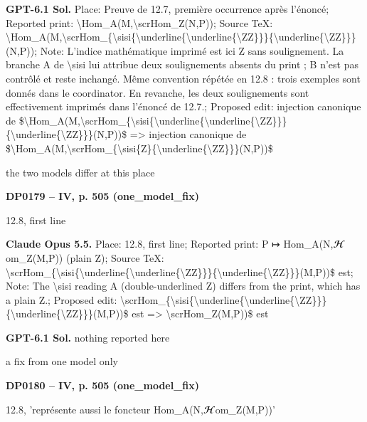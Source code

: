 \textbf{GPT-6.1 Sol.} Place: Preuve de 12.7, première occurrence après l'énoncé; Reported print: \textbackslash{}Hom\_A(M,\textbackslash{}scrHom\_Z(N,P)); Source TeX: \textbackslash{}Hom\_A(M,\textbackslash{}scrHom\_\{\textbackslash{}sisi\{\textbackslash{}underline\{\textbackslash{}underline\{\textbackslash{}ZZ\}\}\}\{\textbackslash{}underline\{\textbackslash{}ZZ\}\}\}(N,P)); Note: L'indice mathématique imprimé est ici Z sans soulignement. La branche A de \textbackslash{}sisi lui attribue deux soulignements absents du print ; B n'est pas contrôlé et reste inchangé. Même convention répétée en 12.8 : trois exemples sont donnés dans le coordinator. En revanche, les deux soulignements sont effectivement imprimés dans l'énoncé de 12.7.; Proposed edit: injection canonique de \$\textbackslash{}Hom\_A(M,\textbackslash{}scrHom\_\{\textbackslash{}sisi\{\textbackslash{}underline\{\textbackslash{}underline\{\textbackslash{}ZZ\}\}\}\{\textbackslash{}underline\{\textbackslash{}ZZ\}\}\}(N,P))\$ =\allowbreak > injection canonique de \$\textbackslash{}Hom\_A(M,\textbackslash{}scrHom\_\{\textbackslash{}sisi\{Z\}\{\textbackslash{}underline\{\textbackslash{}ZZ\}\}\}(N,P))\$\par
the two models differ at this place\par
\par\noindent\hypertarget{DP0179}{}\textbf{DP0179 -- IV, p. 505 (one\_model\_fix)}\par
12.8, first line\par
\textbf{Claude Opus 5.5.} Place: 12.8, first line; Reported print: P ↦ Hom\_A(N,\ensuremath{𝓗}om\_Z(M,P)) (plain Z); Source TeX: \textbackslash{}scrHom\_\{\textbackslash{}sisi\{\textbackslash{}underline\{\textbackslash{}underline\{\textbackslash{}ZZ\}\}\}\{\textbackslash{}underline\{\textbackslash{}ZZ\}\}\}(M,P))\$ est; Note: The \textbackslash{}sisi reading A (double-underlined Z) differs from the print, which has a plain Z.; Proposed edit: \textbackslash{}scrHom\_\{\textbackslash{}sisi\{\textbackslash{}underline\{\textbackslash{}underline\{\textbackslash{}ZZ\}\}\}\{\textbackslash{}underline\{\textbackslash{}ZZ\}\}\}(M,P))\$ est =\allowbreak > \textbackslash{}scrHom\_Z(M,P))\$ est\par
\textbf{GPT-6.1 Sol.} nothing reported here\par
a fix from one model only\par
\par\noindent\hypertarget{DP0180}{}\textbf{DP0180 -- IV, p. 505 (one\_model\_fix)}\par
12.8, 'représente aussi le foncteur Hom\_A(N,\ensuremath{𝓗}om\_Z(M,P))'\par
